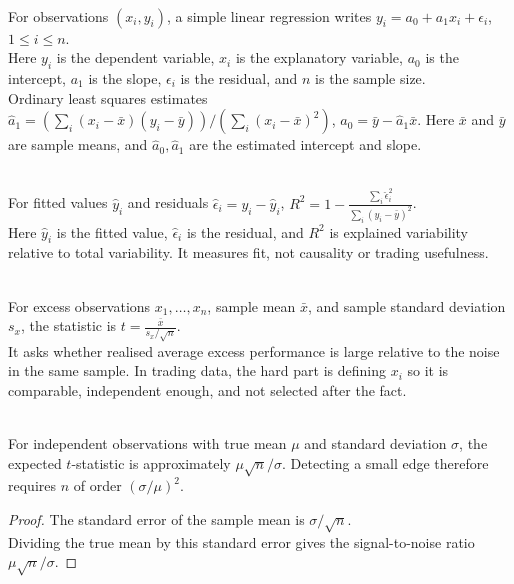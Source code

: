 \documentclass[a4paper,oneside,openany]{book}
\begin{document}
\begin{model} \\
For observations $(x_i,y_i)$, a simple linear regression writes $y_i=a_0+a_1x_i+\epsilon_i$, $1\leq i\leq n$.\\
Here $y_i$ is the dependent variable, $x_i$ is the explanatory variable, $a_0$ is the intercept, $a_1$ is the slope, $\epsilon_i$ is the residual, and $n$ is the sample size.\\
Ordinary least squares estimates $\hat{a}_1= \left( \sum\limits_i(x_i-\bar{x})(y_i-\bar{y}) \right) / \left( \sum\limits_i(x_i-\bar{x})^2 \right)$, $\hat{a}_0=\bar{y}-\hat{a}_1\bar{x}$. Here $\bar{x}$ and $\bar{y}$ are sample means, and $\hat{a}_0,\hat{a}_1$ are the estimated intercept and slope.
\end{model}

\begin{definition} \\
For fitted values $\hat{y}_i$ and residuals $\hat{\epsilon}_i=y_i-\hat{y}_i$, $R^2=1-\frac{\sum\limits_i\hat{\epsilon}_i^2}{\sum\limits_i(y_i-\bar{y})^2}$.\\
Here $\hat{y}_i$ is the fitted value, $\hat{\epsilon}_i$ is the residual, and $R^2$ is explained variability relative to total variability. It measures fit, not causality or trading usefulness.
\end{definition}

\begin{model} \\
For excess observations $x_1,\ldots,x_n$, sample mean $\bar{x}$, and sample standard deviation $s_x$, the statistic is $t=\frac{\bar{x}}{s_x/\sqrt{n}}$.\\
It asks whether realised average excess performance is large relative to the noise in the same sample. In trading data, the hard part is defining $x_i$ so it is comparable, independent enough, and not selected after the fact.
\end{model}

\begin{proposition} \\
For independent observations with true mean $\mu$ and standard deviation $\sigma$, the expected $t$-statistic is approximately $\mu\sqrt{n}/\sigma$. Detecting a small edge therefore requires $n$ of order $(\sigma/\mu)^2$.
\begin{proof}
The standard error of the sample mean is $\sigma/\sqrt{n}$.\\
Dividing the true mean by this standard error gives the signal-to-noise ratio $\mu\sqrt{n}/\sigma$.
\end{proof}
\end{proposition}
\end{document}
